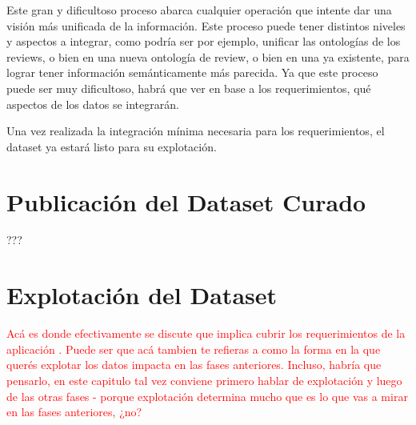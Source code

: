 Este gran y dificultoso proceso abarca cualquier operación que intente dar una visión más unificada de la información. Este
proceso puede tener distintos niveles y aspectos a integrar, como podría ser por ejemplo, unificar las ontologías de los reviews, o bien
en una nueva ontología de review, o bien en una ya existente, para lograr tener información semánticamente más parecida. Ya 
que este proceso puede ser muy dificultoso, habrá que ver en base a los requerimientos, qué aspectos de los datos se integrarán.

Una vez realizada la integración mínima necesaria para los requerimientos, el dataset ya estará listo para su explotación.

\section{Publicación del Dataset Curado}
???

\section{Explotación del Dataset}
\begin{framed}
\textcolor{red}{Acá es donde efectivamente se discute que implica cubrir los requerimientos de la aplicación . Puede ser que acá tambien te refieras a como la forma en la que querés explotar los datos impacta en las fases anteriores. Incluso, habría que pensarlo, en este capitulo tal vez conviene primero hablar de explotación y luego de las otras fases - porque explotación determina mucho que es lo que vas a mirar en las fases anteriores, ¿no?}
\end{framed}

